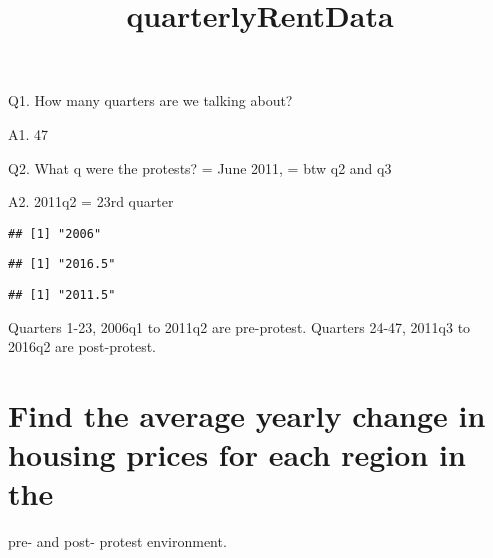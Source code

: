 \documentclass[]{article}
\title{quarterlyRentData}
\author{}
\date{}
\newenvironment{Shaded}{\begin{snugshade}}{\end{snugshade}}
\newcommand{\DecValTok}[1]{\textcolor[rgb]{0.00,0.00,0.81}{{#1}}}
\newcommand{\FloatTok}[1]{\textcolor[rgb]{0.00,0.00,0.81}{{#1}}}
\newcommand{\NormalTok}[1]{{#1}}
\begin{document}
\maketitle

Q1. How many quarters are we talking about?

A1. 47

Q2. What q were the protests? = June 2011, = btw q2 and q3

A2. 2011q2 = 23rd quarter

\begin{Shaded}
\end{Shaded}

\begin{verbatim}
## [1] "2006"
\end{verbatim}

\begin{Shaded}
\end{Shaded}

\begin{verbatim}
## [1] "2016.5"
\end{verbatim}

\begin{Shaded}
\end{Shaded}

\begin{verbatim}
## [1] "2011.5"
\end{verbatim}

Quarters 1-23, 2006q1 to 2011q2 are pre-protest. Quarters 24-47, 2011q3
to 2016q2 are post-protest.

\section{Find the average yearly change in housing prices for each
region in
the}\label{find-the-average-yearly-change-in-housing-prices-for-each-region-in-the}

pre- and post- protest environment.
\end{document}
